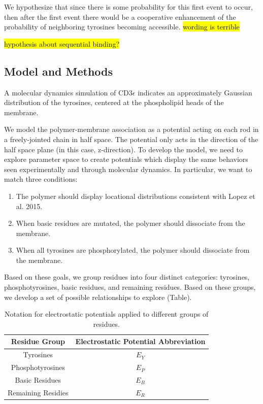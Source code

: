 \documentclass[../../AdvancementSummary.tex]{subfiles}
\begin{document}
We hypothesize that since there is some probability for this first event to occur, then after the first event there would be a cooperative enhancement of the probability of neighboring tyrosines becoming accessible.  \hl{wording is terrible}


\hl{hypothesis about sequential binding?}



\subsection{Model and Methods}


A molecular dynamics simulation of CD3$\epsilon$ indicates an approximately Gaussian distribution of the tyrosines, centered at the phospholipid heads of the membrane. \cite{Lopez2015}

We model the polymer-membrane association as a potential acting on each rod in a freely-jointed chain in half space. The potential only acts in the direction of the half space plane (in this case, z-direction). To develop the model, we need to explore parameter space to create potentials which display the same behaviors seen experimentally and through molecular dynamics. In particular, we want to match three conditions:

\begin{enumerate}
	\item The polymer should display locational distributions consistent with Lopez et al. 2015. \cite{Lopez2015}
	\item When basic residues are mutated, the polymer should dissociate from the membrane.
	\item When all tyrosines are phosphorylated, the polymer should dissociate from the membrane.
\end{enumerate}

Based on these goals, we group residues into four distinct categories: tyrosines, phosphotyrosines, basic residues, and remaining residues. Based on these groups, we develop a set of possible relationships to explore (Table).  

\begin{table}[H]
\caption{Notation for electrostatic potentials applied to different groups of residues. \label{table: ElecPotentialNotation}}
\begin{center}
\begin{tabular}{ c | c}
\hline
Residue Group & Electrostatic Potential Abbreviation \\
\hline
Tyrosines & $E_Y$ \\
Phosphotyrosines & $E_P$ \\
Basic Residues & $E_B$ \\
Remaining Residies & $E_R$ \\
\hline
\end{tabular}
\end{center}
\end{table}
\end{document}
